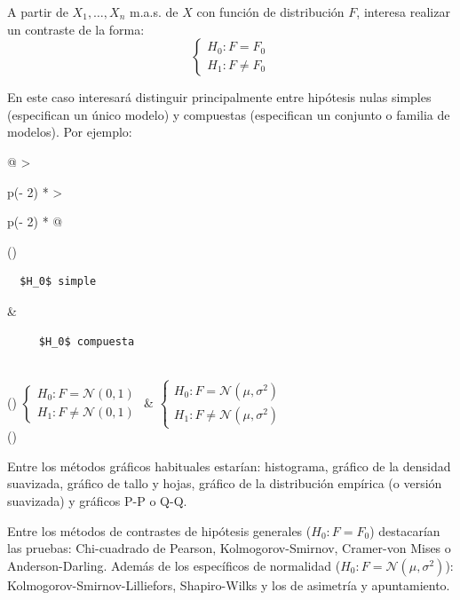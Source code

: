 \documentclass[
]{book}
\theoremstyle{break}
\theoremstyle{nonumberplain}
\begin{document}
A partir de \(X_1,\ldots,X_n\) m.a.s. de \(X\) con función de
distribución \(F\), interesa realizar un contraste de la forma:
\[\left \{
\begin{array}{l}
H_0:F=F_0\\
H_1:F\neq F_0
\end{array}
\right.\]

En este caso interesará distinguir principalmente entre hipótesis nulas simples (especifican un único modelo) y compuestas (especifican un conjunto o familia de modelos).
Por ejemplo:

\begin{longtable}[]{@{}
  >{\raggedright\arraybackslash}p{(\columnwidth - 2\tabcolsep) * }
  >{\raggedright\arraybackslash}p{(\columnwidth - 2\tabcolsep) * }@{}}
\toprule()
\begin{minipage}[b]{\linewidth}\raggedright
\begin{verbatim}
  $H_0$ simple
\end{verbatim}
\end{minipage} & \begin{minipage}[b]{\linewidth}\raggedright
\begin{verbatim}
     $H_0$ compuesta
\end{verbatim}
\end{minipage} \\
\midrule()
\endhead
\(\left \{ \begin{array}{l} H_0:F= \mathcal{N}(0,1)\\ H_1:F\neq \mathcal{N}(0,1) \end{array} \right.\) & \(\left \{ \begin{array}{l} H_0:F= \mathcal{N}(\mu,\sigma^2)\\ H_1:F\neq \mathcal{N}(\mu,\sigma^2) \end{array} \right.\) \\
\bottomrule()
\end{longtable}

Entre los métodos gráficos habituales estarían: histograma, gráfico de la densidad suavizada, gráfico de tallo y hojas, gráfico de la distribución empírica (o versión suavizada) y gráficos P-P o Q-Q.

Entre los métodos de contrastes de hipótesis generales (\(H_0:F=F_0\)) destacarían las pruebas: Chi-cuadrado de Pearson, Kolmogorov-Smirnov, Cramer-von Mises o Anderson-Darling.
Además de los específicos de normalidad (\(H_0:F= \mathcal{N}(\mu,\sigma^2)\)): Kolmogorov-Smirnov-Lilliefors, Shapiro-Wilks y los de asimetría y apuntamiento.
\end{document}
